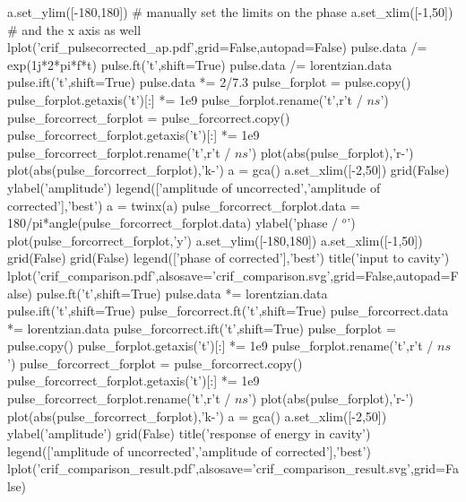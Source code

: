 \begin{python}
a.set_ylim([-180,180]) # manually set the limits on the phase
a.set_xlim([-1,50]) # and the x axis as well
lplot('crif_pulsecorrected_ap.pdf',grid=False,autopad=False)
pulse.data /= exp(1j*2*pi*f*t)
pulse.ft('t',shift=True)
pulse.data /= lorentzian.data
pulse.ift('t',shift=True)
pulse.data *= 2/7.3
pulse_forplot = pulse.copy()
pulse_forplot.getaxis('t')[:] *= 1e9
pulse_forplot.rename('t',r't / $ns$')
pulse_forcorrect_forplot = pulse_forcorrect.copy()
pulse_forcorrect_forplot.getaxis('t')[:] *= 1e9
pulse_forcorrect_forplot.rename('t',r't / $ns$')
plot(abs(pulse_forplot),'r-')
plot(abs(pulse_forcorrect_forplot),'k-')
a = gca()
a.set_xlim([-2,50])
grid(False)
ylabel('amplitude')
legend(['amplitude of uncorrected','amplitude of corrected'],'best')
a = twinx(a)
pulse_forcorrect_forplot.data = 180/pi*angle(pulse_forcorrect_forplot.data)
ylabel('phase / $^o$')
plot(pulse_forcorrect_forplot,'y')
a.set_ylim([-180,180])
a.set_xlim([-1,50])
grid(False)
grid(False)
legend(['phase of corrected'],'best')
title('input to cavity')
lplot('crif_comparison.pdf',alsosave='crif_comparison.svg',grid=False,autopad=False)
pulse.ft('t',shift=True)
pulse.data *= lorentzian.data
pulse.ift('t',shift=True)
pulse_forcorrect.ft('t',shift=True)
pulse_forcorrect.data *= lorentzian.data
pulse_forcorrect.ift('t',shift=True)
pulse_forplot = pulse.copy()
pulse_forplot.getaxis('t')[:] *= 1e9
pulse_forplot.rename('t',r't / $ns$')
pulse_forcorrect_forplot = pulse_forcorrect.copy()
pulse_forcorrect_forplot.getaxis('t')[:] *= 1e9
pulse_forcorrect_forplot.rename('t',r't / $ns$')
plot(abs(pulse_forplot),'r-')
plot(abs(pulse_forcorrect_forplot),'k-')
a = gca()
a.set_xlim([-2,50])
ylabel('amplitude')
grid(False)
title('response of energy in cavity')
legend(['amplitude of uncorrected','amplitude of corrected'],'best')
lplot('crif_comparison_result.pdf',alsosave='crif_comparison_result.svg',grid=False)
\end{python}

